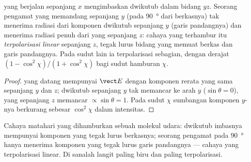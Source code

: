 \begin{proposition}\label{prop:b2:dipole-radiation:polarization}
 yang berjalan sepanjang $x$ mengimbaskan dwikutub dalam bidang $yz$.
Seorang pengamat yang memandang sepanjang $y$ (pada \qty{90}{\degree} dari berkasnya) tak menerima
radiasi dari komponen dwikutub sepanjang $y$ (garis pandangnya)
dan menerima radiasi penuh dari yang sepanjang $z$: cahaya yang terhambur itu
\emph{terpolarisasi linear} sepanjang $z$, tegak lurus bidang
yang memuat berkas dan garis pandangnya. Pada sudut lain ia
terpolarisasi sebagian, dengan derajat $(1 - \cos^2\chi)/(1 + \cos^2\chi)$ bagi
sudut hamburan $\chi$.
\end{proposition}

\begin{proof}
 yang datang mempunyai $\vect E$ dengan komponen rerata yang sama
sepanjang $y$ dan $z$; dwikutub sepanjang $y$ tak memancar ke arah $y$ ($\sin
\theta = 0$), yang sepanjang $z$ memancar $\propto\sin\theta = 1$. Pada sudut $\chi$
sumbangan komponen $y$-nya berkurang sebesar $\cos^2\chi$ dalam intensitas.
\end{proof}

\begin{omfigure}

{\small Cahaya matahari yang dihamburkan sebuah molekul udara: dwikutub imbasnya mempunyai
komponen yang tegak lurus berkasnya; seorang pengamat pada \qty{90}{\degree}
hanya menerima komponen yang tegak lurus garis pandangnya ---
cahaya yang terpolarisasi linear. Di sanalah langit paling biru dan paling terpolarisasi.}
\end{omfigure}

